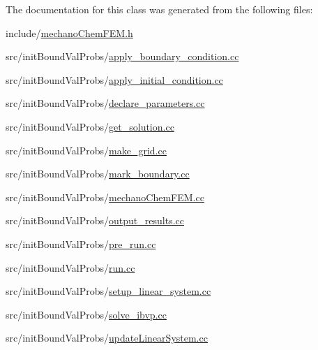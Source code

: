 The documentation for this class was generated from the following files\+:\begin{DoxyCompactItemize}
\item 
include/\mbox{\hyperlink{mechano_chem_f_e_m_8h}{mechano\+Chem\+F\+E\+M.\+h}}\item 
src/init\+Bound\+Val\+Probs/\mbox{\hyperlink{apply__boundary__condition_8cc}{apply\+\_\+boundary\+\_\+condition.\+cc}}\item 
src/init\+Bound\+Val\+Probs/\mbox{\hyperlink{apply__initial__condition_8cc}{apply\+\_\+initial\+\_\+condition.\+cc}}\item 
src/init\+Bound\+Val\+Probs/\mbox{\hyperlink{init_bound_val_probs_2declare__parameters_8cc}{declare\+\_\+parameters.\+cc}}\item 
src/init\+Bound\+Val\+Probs/\mbox{\hyperlink{get__solution_8cc}{get\+\_\+solution.\+cc}}\item 
src/init\+Bound\+Val\+Probs/\mbox{\hyperlink{make__grid_8cc}{make\+\_\+grid.\+cc}}\item 
src/init\+Bound\+Val\+Probs/\mbox{\hyperlink{mark__boundary_8cc}{mark\+\_\+boundary.\+cc}}\item 
src/init\+Bound\+Val\+Probs/\mbox{\hyperlink{mechano_chem_f_e_m_8cc}{mechano\+Chem\+F\+E\+M.\+cc}}\item 
src/init\+Bound\+Val\+Probs/\mbox{\hyperlink{output__results_8cc}{output\+\_\+results.\+cc}}\item 
src/init\+Bound\+Val\+Probs/\mbox{\hyperlink{pre__run_8cc}{pre\+\_\+run.\+cc}}\item 
src/init\+Bound\+Val\+Probs/\mbox{\hyperlink{run_8cc}{run.\+cc}}\item 
src/init\+Bound\+Val\+Probs/\mbox{\hyperlink{setup__linear__system_8cc}{setup\+\_\+linear\+\_\+system.\+cc}}\item 
src/init\+Bound\+Val\+Probs/\mbox{\hyperlink{solve__ibvp_8cc}{solve\+\_\+ibvp.\+cc}}\item 
src/init\+Bound\+Val\+Probs/\mbox{\hyperlink{update_linear_system_8cc}{update\+Linear\+System.\+cc}}\end{DoxyCompactItemize}
